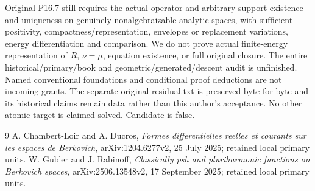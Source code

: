 \documentclass[11pt]{article}
\begin{document}
Original P16.7 still requires the actual operator and arbitrary-support
existence and uniqueness on genuinely nonalgebraizable analytic spaces,
with sufficient positivity, compactness/representation, envelopes or
replacement variations, energy differentiation and comparison. We do not
prove actual finite-energy representation of $R$, $\nu=\mu$, equation
existence, or full original closure. The entire historical/primary/book
and geometric/generated/descent audit is unfinished. Named conventional
foundations and conditional proof deductions are not incoming grants.
The separate original-residual.txt is preserved byte-for-byte and its
historical claims remain data rather than this author's acceptance.
No other atomic target is claimed solved. Candidate is false.

\begin{thebibliography}{9}
 A. Chambert-Loir and A. Ducros, \emph{Formes differentielles
reelles et courants sur les espaces de Berkovich}, arXiv:1204.6277v2,
25 July 2025; retained local primary units.
 W. Gubler and J. Rabinoff, \emph{Classically psh and
pluriharmonic functions on Berkovich spaces}, arXiv:2506.13548v2,
17 September 2025; retained local primary units.
\end{thebibliography}
\end{document}
